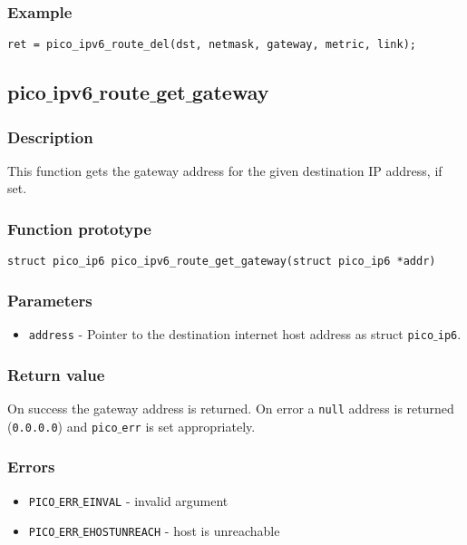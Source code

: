 \subsubsection*{Example}
\begin{verbatim}
ret = pico_ipv6_route_del(dst, netmask, gateway, metric, link);
\end{verbatim}



\subsection{pico$\_$ipv6$\_$route$\_$get$\_$gateway}

\subsubsection*{Description}
This function gets the gateway address for the given destination IP address, if set.

\subsubsection*{Function prototype}
\begin{verbatim}
struct pico_ip6 pico_ipv6_route_get_gateway(struct pico_ip6 *addr)
\end{verbatim}

\subsubsection*{Parameters}
\begin{itemize}[noitemsep]
\item \texttt{address} - Pointer to the destination internet host address as struct \texttt{pico$\_$ip6}.
\end{itemize}

\subsubsection*{Return value}
On success the gateway address is returned.
On error a \texttt{null} address is returned (\texttt{0.0.0.0}) and \texttt{pico$\_$err} is set appropriately.

\subsubsection*{Errors}
\begin{itemize}[noitemsep]
\item \texttt{PICO$\_$ERR$\_$EINVAL} - invalid argument
\item \texttt{PICO$\_$ERR$\_$EHOSTUNREACH} - host is unreachable
\end{itemize}


